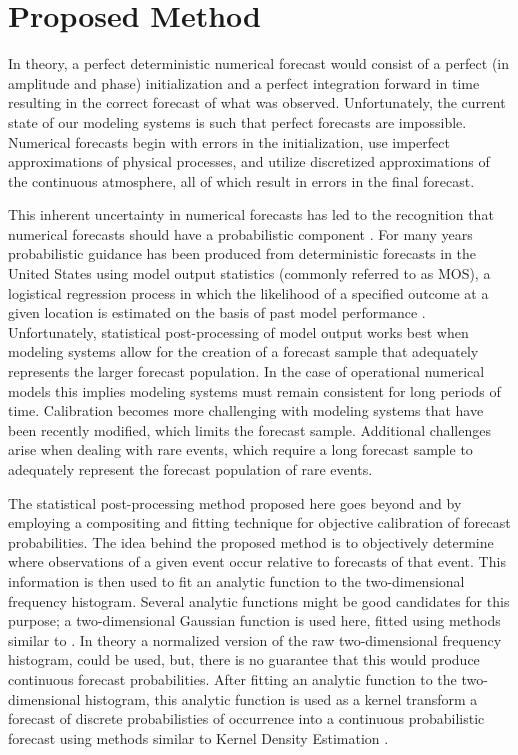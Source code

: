 

\chapter{Proposed Method}
\label{method}

In theory, a perfect deterministic numerical forecast would consist of a perfect (in amplitude and phase) initialization and a perfect integration forward in time resulting in the correct forecast of what was observed. Unfortunately, the current state of our modeling systems is such that perfect forecasts are impossible. Numerical forecasts begin with errors in the initialization, use imperfect approximations of physical processes, and utilize discretized approximations of the continuous atmosphere, all of which result in errors in the final forecast.

This inherent uncertainty in numerical forecasts has led to the recognition that numerical forecasts should have a probabilistic component \citep{ADD}. For many years probabilistic guidance has been produced from deterministic forecasts in the United States using model output statistics (commonly referred to as MOS), a logistical regression process in which the likelihood of a specified outcome at a given location is estimated on the basis of past model performance \citep{Glahn1972}. Unfortunately, statistical post-processing of model output works best when modeling systems allow for the creation of a forecast sample that adequately represents the larger forecast population. In the case of operational numerical models this implies modeling systems must remain consistent for long periods of time. Calibration becomes more challenging with modeling systems that have been recently modified, which limits the forecast sample. Additional challenges arise when dealing with rare events, which require a long forecast sample to adequately represent the forecast population of rare events.

The statistical post-processing method proposed here goes beyond \cite{Theis2005} and \cite{Sobash2011} by employing a compositing and fitting technique for objective calibration of forecast probabilities. The idea behind the proposed method is to objectively determine where observations of a given event occur relative to forecasts of that event. This information is then used to fit an analytic function to the two-dimensional frequency histogram. Several analytic functions might be good candidates for this purpose; a two-dimensional Gaussian function is used here, fitted using methods similar to \cite{Lak2010}. In theory a normalized version of the raw two-dimensional frequency histogram, could be used, but, there is no guarantee that this would produce continuous forecast probabilities. After fitting an analytic function to the two-dimensional histogram, this analytic function is used as a kernel transform a forecast of discrete probabilisties of occurrence into a continuous probabilistic forecast using methods similar to Kernel Density Estimation \citep{Silverman...}.




